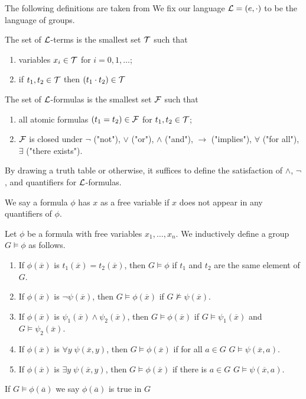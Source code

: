 \documentclass[../main.tex]{subfiles}
\begin{document}
The following definitions are taken from \cite{Marker2024}
We fix our language $\mathcal{L}=(e,\cdot)$ to be the language of groups.

\begin{definition}
    The set of $\mathcal{L}$-terms is the smallest set $\mathcal{T}$ such that \begin{enumerate}
        \item variables $x_i\in\mathcal{T}$ for $i=0,1,\dots$;
        \item if $t_1,t_2\in \mathcal{T}$ then $(t_1 \cdot t_2)\in \mathcal{T}$
    \end{enumerate}
\end{definition}

\begin{definition}
    The set of $\mathcal{L}$-formulas is the smallest set $\mathcal{F}$ such that \begin{enumerate}
        \item all atomic formulas $(t_1=t_2)\in\mathcal{F}$ for $t_1,t_2\in \mathcal{T}$;
        \item $\mathcal{F}$ is closed under $\neg$ ("not"), $\vee$ ("or"), $\wedge$ ("and"), $\rightarrow$ ("implies"), $\forall$ ("for all"), $\exists$ ("there exists").
    \end{enumerate}
\end{definition}

By drawing a truth table or otherwise, it suffices to define the satisfaction of $\wedge$, $\neg$, and quantifiers for $\mathcal{L}$-formulas.

\begin{definition}
    We say a formula $\phi$ has $x$ as a free variable if $x$ does not appear in any quantifiers of $\phi$.
\end{definition}

\begin{definition}
    Let $\phi$ be a formula with free variables $x_1,\dots,x_n$. We inductively define a group $G\models \phi$ as follows. \begin{enumerate}
        \item If $\phi(\overline x)$ is $t_1(\overline x)=t_2(\overline x)$, then $G\models \phi$ if $t_1$ and $t_2$ are the same element of $G$.
        \item If $\phi(\overline x)$ is $\neg \psi(\overline x)$, then $G\models \phi(\overline x)$ if $G \nvDash \psi(\overline x)$.
        \item If $\phi(\overline x)$ is $\psi_1(\overline x) \wedge \psi_2(\overline x)$, then $G\models \phi(\overline x)$ if $G\models \psi_1(\overline x)$ and $G\models \psi_2(\overline x)$.
        \item If $\phi(\overline x)$ is $\forall y \; \psi(\overline x,y)$, then $G\models \phi(\overline x)$ if for all $a \in G$  $G\models \psi(\overline x, a)$.
        \item If $\phi(\overline x)$ is $\exists y \; \psi(\overline x,y)$, then $G\models \phi(\overline x)$ if there is $a \in G$  $G\models \psi(\overline x, a)$.
    \end{enumerate}

    If $G\models \phi(\overline a)$ we say $\phi(\overline a)$ is true in $G$
\end{definition}
\end{document}
